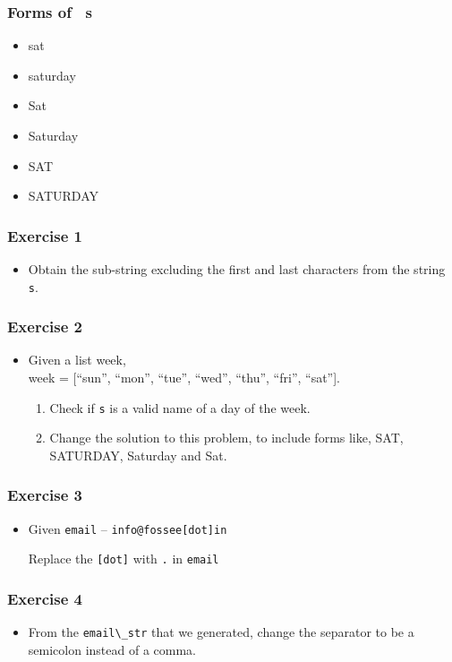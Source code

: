 \documentclass[presentation]{beamer}
\begin{document}
\begin{frame}
\frametitle{Forms of ~s~}
\label{sec-4}


\begin{itemize}
\item sat
\item saturday
\item Sat
\item Saturday
\item SAT
\item SATURDAY
\end{itemize}
\end{frame}
\begin{frame}
\frametitle{Exercise 1}
\label{sec-5}


\begin{itemize}
\item Obtain the sub-string excluding the first and last characters from
  the string \verb~s~.
\end{itemize}
\end{frame}
\begin{frame}
\frametitle{Exercise 2}
\label{sec-6}


\begin{itemize}
\item Given a list week,\\ week = [``sun'', ``mon'', ``tue'', ``wed'', ``thu'', ``fri'', ``sat''].\\
\vspace{5pt}
\begin{enumerate}
\item Check if \verb~s~ is a valid name of a day of the
  week.
\item Change the solution to this problem, to include forms like,
  SAT, SATURDAY, Saturday and Sat.
\end{enumerate}
\end{itemize}  
\end{frame}
\begin{frame}
\frametitle{Exercise 3}
\label{sec-7}


\begin{itemize}
\item Given \verb~email~ -- \verb~info@fossee[dot]in~

  Replace the \verb~[dot]~ with \verb~.~ in \verb~email~
\end{itemize}
\end{frame}
\begin{frame}
\frametitle{Exercise 4}
\label{sec-8}


\begin{itemize}
\item From the \verb~email\_str~ that we generated, change the separator to be a
  semicolon instead of a comma.
\end{itemize}
\end{frame}
\end{document}
